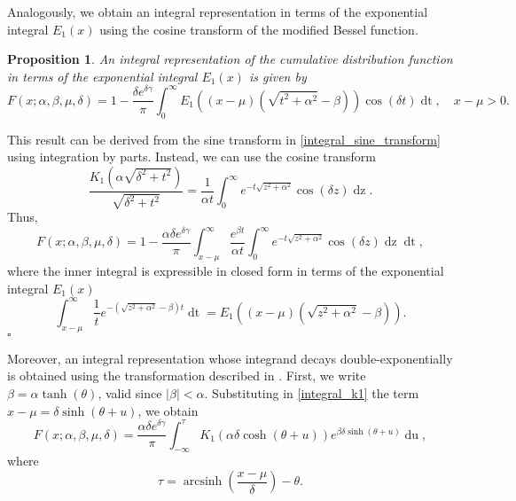 \documentclass[10pt,a4paper,oneside]{article}
\newtheorem{proposition}[theorem]{Proposition}
\newenvironment{proof}{\noindent{\bf Proof:}}{\hfill$\square$}
\DeclareMathOperator{\arcsinh}{arcsinh}
\numberwithin{equation}{section}
\begin{document}
Analogously, we obtain an integral representation in terms of the exponential integral $E_1(x)$ using the cosine transform of the modified Bessel function.
\begin{proposition}
An integral representation of the cumulative distribution function in terms of the exponential integral $E_1(x)$ is given by
\begin{equation}
F(x; \alpha, \beta, \mu, \delta) = 1 - \frac{\delta e^{\delta \gamma}}{\pi}\int_0^{\infty} E_1\left((x-\mu)(\sqrt{t^2 + \alpha^2} - \beta)\right) \cos(\delta t) \mathop{dt}, \quad x-\mu > 0.
\end{equation}
\end{proposition}
\begin{proof}
This result can be derived from the sine transform in \eqref{integral_sine_transform} using integration by parts. Instead, we can use the cosine transform \cite[\S 1.4]{Bateman1954}
\begin{equation*}
\frac{K_1\left(\alpha\sqrt{\delta^2 + t^2}\right)}{\sqrt{\delta^2 + t^2}} = \frac{1}{\alpha t}\int_0^{\infty} e^{-t\sqrt{z^2 + \alpha^2}} \cos(\delta z) \mathop{dz}.
\end{equation*}
Thus,
\begin{equation*}
F(x; \alpha, \beta, \mu, \delta) = 1 - \frac{\alpha \delta e^{\delta \gamma}}{\pi}\int_{x-\mu}^{\infty} \frac{e^{\beta t}}{\alpha t}\int_0^{\infty} e^{-t\sqrt{z^2 + \alpha^2}} \cos(\delta z) \mathop{dz} \mathop{dt},
\end{equation*}
where the inner integral is expressible in closed form in terms of the exponential integral $E_1(x)$
\begin{equation*}
\int_{x-\mu}^{\infty}\frac{1}{t}e^{-(\sqrt{z^2 + \alpha^2} - \beta)t} \mathop{dt} = E_1\left((x-\mu)(\sqrt{z^2 + \alpha^2} - \beta)\right).
\end{equation*}
\end{proof}

Moreover, an integral representation whose integrand decays double-exponentially is obtained using the transformation described in \cite[\S 42.4]{Temme2015}. First, we write $\beta = \alpha \tanh(\theta)$, valid since $|\beta| < \alpha$. Substituting in \eqref{integral_k1} the term $x-\mu = \delta \sinh(\theta + u)$, we obtain
\begin{equation}
F(x; \alpha, \beta, \mu, \delta) = \frac{\alpha \delta e^{\delta \gamma}}{\pi} \int_{-\infty}^{\tau} K_1 \left(\alpha \delta \cosh(\theta + u)\right) e^{\beta \delta \sinh(\theta + u)} \mathop{du},
\end{equation}
where
\begin{equation}
\tau = \arcsinh\left(\frac{x - \mu}{\delta}\right) - \theta.
\end{equation}
\end{document}
